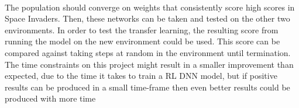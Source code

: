\paragraph{}

The population should converge on weights that consistently score high scores in Space Invaders. Then, these networks can be taken and tested on the other two environments. In order to test the transfer learning, the resulting score from running the model on the new environment could be used. This score can be compared against taking steps at random in the environment until termination. The time constraints on this project might result in a smaller improvement than expected, due to the time it takes to train a RL DNN model, but if positive results can be produced in a small time-frame then even better results could be produced with more time
